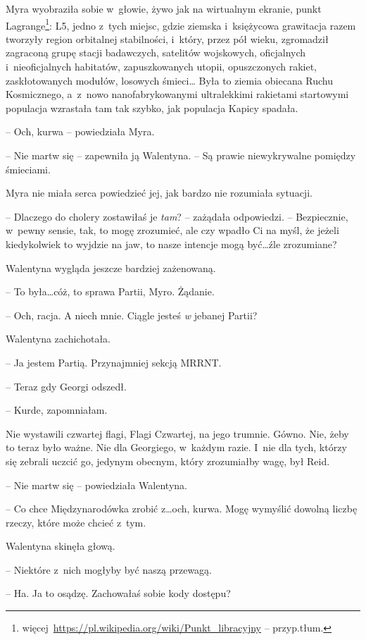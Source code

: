 \documentclass[oneside,polish,11pt,sfheadings]{mwbk}
\begin{document}
Myra wyobraziła sobie w~głowie, żywo jak na wirtualnym ekranie, punkt
Lagrange\footnote{więcej~\url{https://pl.wikipedia.org/wiki/Punkt\_libracyjny}
-- przyp.tłum.}: L5, jedno z~tych miejsc, gdzie ziemska i~księżycowa
grawitacja razem tworzyły region orbitalnej stabilności, i~który, przez
pół wieku, zgromadził zagraconą grupę stacji badawczych, satelitów
wojskowych, oficjalnych i~nieoficjalnych habitatów, zapuszkowanych
utopii, opuszczonych rakiet, zaskłotowanych modułów, losowych śmieci\ldots
Była to ziemia obiecana Ruchu Kosmicznego, a~z~nowo nanofabrykowanymi
ultralekkimi rakietami startowymi populacja wzrastała tam tak szybko,
jak populacja Kapicy spadała.

-- Och, kurwa -- powiedziała Myra.

-- Nie martw się -- zapewniła ją Walentyna. -- Są prawie niewykrywalne
pomiędzy śmieciami.

Myra nie miała serca powiedzieć jej, jak bardzo nie rozumiała sytuacji.

-- Dlaczego do cholery zostawiłaś je \textit{tam}? -- zażądała odpowiedzi. -- Bezpiecznie, w~pewny sensie, tak, to mogę zrozumieć, ale czy wpadło Ci
na myśl, że jeżeli kiedykolwiek to wyjdzie na jaw, to nasze intencje
mogą być\ldots źle zrozumiane?

Walentyna wygląda jeszcze bardziej zażenowaną. 

-- To była\ldots cóż, to
sprawa Partii, Myro. Żądanie.

-- Och, racja. A niech mnie. Ciągle jesteś \textit{w }jebanej Partii?

Walentyna zachichotała. 

-- Ja jestem Partią. Przynajmniej sekcją MRRNT.

-- Teraz gdy Georgi odszedł. 

-- Kurde, zapomniałam.

Nie wystawili czwartej flagi, Flagi Czwartej, na jego trumnie. Gówno.
Nie, żeby to teraz było ważne. Nie dla Georgiego, w~każdym razie. I~nie
dla tych, którzy się zebrali uczcić go, jedynym obecnym, który
zrozumiałby wagę, był Reid.

-- Nie martw się -- powiedziała Walentyna.

-- Co chce Międzynarodówka zrobić z\ldots och, kurwa. Mogę wymyślić dowolną
liczbę rzeczy, które może chcieć z~tym.

Walentyna skinęła głową. 

-- Niektóre z~nich mogłyby być naszą przewagą.

-- Ha. Ja to osądzę. Zachowałaś sobie kody dostępu?
\end{document}
